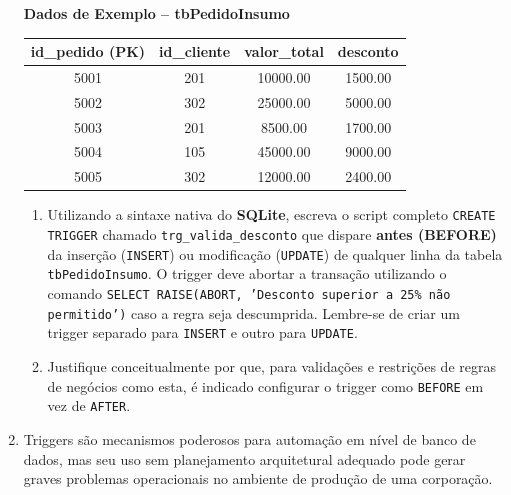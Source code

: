 \documentclass[12pt,a4paper]{article}
\newcommand{\resposta}[1]{}
\begin{document}
\begin{enumerate}[label=\textbf{Exercício \arabic* -}, leftmargin=*, itemsep=2.5em]
\begin{center}
\end{center}

\begin{center}
    \textbf{Dados de Exemplo -- tbPedidoInsumo} \\[0.2cm]
    \begin{tabular}{|c|c|c|c|}
        \hline
        \textbf{id\_pedido (PK)} & \textbf{id\_cliente} & \textbf{valor\_total} & \textbf{desconto} \\
        \hline
        5001 & 201 & 10000.00 & 1500.00 \\
        5002 & 302 & 25000.00 & 5000.00 \\
        5003 & 201 & 8500.00 & 1700.00 \\
        5004 & 105 & 45000.00 & 9000.00 \\
        5005 & 302 & 12000.00 & 2400.00 \\
        \hline
    \end{tabular}
\end{center}

\begin{enumerate}[label=\textbf{\alph*)}]
    \item Utilizando a sintaxe nativa do \textbf{SQLite}, escreva o script completo \texttt{CREATE TRIGGER} chamado \texttt{trg\_valida\_desconto} que dispare \textbf{antes (BEFORE)} da inserção (\texttt{INSERT}) ou modificação (\texttt{UPDATE}) de qualquer linha da tabela \texttt{tbPedidoInsumo}. O trigger deve abortar a transação utilizando o comando \texttt{SELECT RAISE(ABORT, 'Desconto superior a 25\% não permitido')} caso a regra seja descumprida. Lembre-se de criar um trigger separado para \texttt{INSERT} e outro para \texttt{UPDATE}.
    \resposta{5.5cm}

    \item Justifique conceitualmente por que, para validações e restrições de regras de negócios como esta, é indicado configurar o trigger como \texttt{BEFORE} em vez de \texttt{AFTER}.
    \resposta{2.5cm}
\end{enumerate}


\item Triggers são mecanismos poderosos para automação em nível de banco de dados, mas seu uso sem planejamento arquitetural adequado pode gerar graves problemas operacionais no ambiente de produção de uma corporação.


\end{enumerate}
\end{document}
